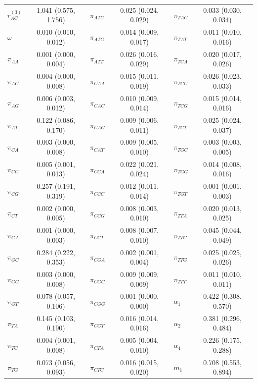 \documentclass{svmult}
\begin{document}
\begin{center}
\begin{tabular}{lc lc lc}
$r_{AC}^{(3)}$ & 1.041 (0.575, 1.756) & $\pi_{ATC}$    & 0.025 (0.024, 0.029) & $\pi_{TAC}$    & 0.033 (0.030, 0.034) \\
$\omega$       & 0.010 (0.010, 0.012) & $\pi_{ATG}$    & 0.014 (0.009, 0.017) & $\pi_{TAT}$    & 0.011 (0.010, 0.016) \\
$\pi_{AA}$     & 0.001 (0.000, 0.004) & $\pi_{ATT}$    & 0.026 (0.016, 0.029) & $\pi_{TCA}$    & 0.020 (0.017, 0.026) \\
$\pi_{AC}$     & 0.004 (0.000, 0.008) & $\pi_{CAA}$    & 0.015 (0.011, 0.019) & $\pi_{TCC}$    & 0.026 (0.023, 0.033) \\
$\pi_{AG}$     & 0.006 (0.003, 0.012) & $\pi_{CAC}$    & 0.010 (0.009, 0.014) & $\pi_{TCG}$    & 0.015 (0.014, 0.016) \\
$\pi_{AT}$     & 0.122 (0.086, 0.170) & $\pi_{CAG}$    & 0.009 (0.006, 0.011) & $\pi_{TCT}$    & 0.025 (0.024, 0.037) \\
$\pi_{CA}$     & 0.003 (0.000, 0.008) & $\pi_{CAT}$    & 0.009 (0.005, 0.010) & $\pi_{TGC}$    & 0.003 (0.003, 0.005) \\
$\pi_{CC}$     & 0.005 (0.001, 0.013) & $\pi_{CCA}$    & 0.022 (0.021, 0.024) & $\pi_{TGG}$    & 0.014 (0.008, 0.016) \\
$\pi_{CG}$     & 0.257 (0.191, 0.319) & $\pi_{CCC}$    & 0.012 (0.011, 0.014) & $\pi_{TGT}$    & 0.001 (0.001, 0.003) \\
$\pi_{CT}$     & 0.002 (0.000, 0.005) & $\pi_{CCG}$    & 0.008 (0.003, 0.010) & $\pi_{TTA}$    & 0.020 (0.013, 0.025) \\
$\pi_{GA}$     & 0.001 (0.000, 0.003) & $\pi_{CCT}$    & 0.008 (0.007, 0.010) & $\pi_{TTC}$    & 0.045 (0.044, 0.049) \\
$\pi_{GC}$     & 0.284 (0.222, 0.353) & $\pi_{CGA}$    & 0.002 (0.001, 0.004) & $\pi_{TTG}$    & 0.025 (0.025, 0.026) \\
$\pi_{GG}$     & 0.003 (0.000, 0.008) & $\pi_{CGC}$    & 0.009 (0.009, 0.009) & $\pi_{TTT}$    & 0.011 (0.010, 0.011) \\
$\pi_{GT}$     & 0.078 (0.057, 0.106) & $\pi_{CGG}$    & 0.001 (0.000, 0.000) & $\alpha_1$     & 0.422 (0.308, 0.570) \\
$\pi_{TA}$     & 0.145 (0.103, 0.190) & $\pi_{CGT}$    & 0.016 (0.014, 0.016) & $\alpha_2$     & 0.381 (0.296, 0.484) \\
$\pi_{TC}$     & 0.004 (0.001, 0.008) & $\pi_{CTA}$    & 0.005 (0.004, 0.010) & $\alpha_4$     & 0.226 (0.175, 0.288) \\
$\pi_{TG}$     & 0.073 (0.056, 0.093) & $\pi_{CTC}$    & 0.016 (0.015, 0.020) & $m_1$          & 0.708 (0.553, 0.894) \\

\end{tabular}
\end{center}
\end{document}
